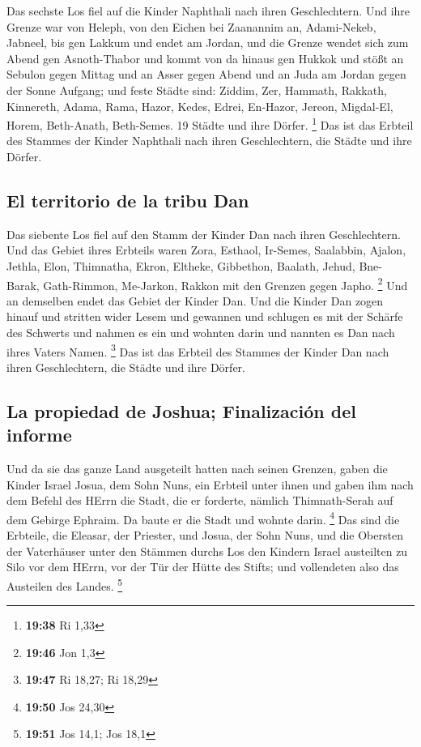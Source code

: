  Das sechste Los fiel auf die Kinder Naphthali nach ihren
Geschlechtern.  Und ihre Grenze war von Heleph, von den
Eichen bei Zaanannim an, Adami-Nekeb, Jabneel, bis gen Lakkum und endet
am Jordan,  und die Grenze wendet sich zum Abend gen
Asnoth-Thabor und kommt von da hinaus gen Hukkok und stößt an Sebulon
gegen Mittag und an Asser gegen Abend und an Juda am Jordan gegen der
Sonne Aufgang;  und feste Städte sind: Ziddim, Zer,
Hammath, Rakkath, Kinnereth,  Adama, Rama, Hazor,
 Kedes, Edrei, En-Hazor,  Jereon,
Migdal-El, Horem, Beth-Anath, Beth-Semes. 19 Städte und ihre Dörfer.
\footnote{\textbf{19:38} Ri 1,33}  Das ist das Erbteil
des Stammes der Kinder Naphthali nach ihren Geschlechtern, die Städte
und ihre Dörfer.

\hypertarget{el-territorio-de-la-tribu-dan}{%
\subsection{El territorio de la tribu
Dan}\label{el-territorio-de-la-tribu-dan}}

 Das siebente Los fiel auf den Stamm der Kinder Dan nach
ihren Geschlechtern.  Und das Gebiet ihres Erbteils waren
Zora, Esthaol, Ir-Semes,  Saalabbin, Ajalon, Jethla,
 Elon, Thimnatha, Ekron,  Eltheke,
Gibbethon, Baalath,  Jehud, Bne-Barak, Gath-Rimmon,
 Me-Jarkon, Rakkon mit den Grenzen gegen Japho.
\footnote{\textbf{19:46} Jon 1,3}  Und an demselben endet
das Gebiet der Kinder Dan. Und die Kinder Dan zogen hinauf und stritten
wider Lesem und gewannen und schlugen es mit der Schärfe des Schwerts
und nahmen es ein und wohnten darin und nannten es Dan nach ihres Vaters
Namen. \footnote{\textbf{19:47} Ri 18,27; Ri 18,29}  Das
ist das Erbteil des Stammes der Kinder Dan nach ihren Geschlechtern, die
Städte und ihre Dörfer.

\hypertarget{la-propiedad-de-joshua-finalizaciuxf3n-del-informe}{%
\subsection{La propiedad de Joshua; Finalización del
informe}\label{la-propiedad-de-joshua-finalizaciuxf3n-del-informe}}

 Und da sie das ganze Land ausgeteilt hatten nach seinen
Grenzen, gaben die Kinder Israel Josua, dem Sohn Nuns, ein Erbteil unter
ihnen  und gaben ihm nach dem Befehl des HErrn die Stadt,
die er forderte, nämlich Thimnath-Serah auf dem Gebirge Ephraim. Da
baute er die Stadt und wohnte darin. \footnote{\textbf{19:50} Jos 24,30}
 Das sind die Erbteile, die Eleasar, der Priester, und
Josua, der Sohn Nuns, und die Obersten der Vaterhäuser unter den Stämmen
durchs Los den Kindern Israel austeilten zu Silo vor dem HErrn, vor der
Tür der Hütte des Stifts; und vollendeten also das Austeilen des Landes.
\footnote{\textbf{19:51} Jos 14,1; Jos 18,1}

